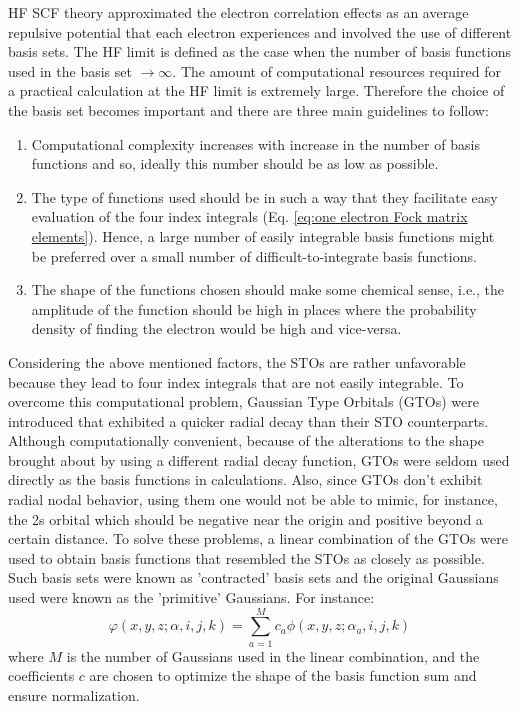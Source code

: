             HF SCF theory approximated the electron correlation effects as an average repulsive potential that each electron experiences and involved the use of different basis sets. The HF limit is defined as the case when the number of basis functions used in the basis set $\to \infty$. The amount of computational resources required for a practical calculation at the HF limit is extremely large. Therefore the choice of the basis set becomes important and there are three main guidelines to follow:
            \begin{enumerate}
               \item Computational complexity increases with increase in the number of basis functions and so, ideally this number should be as low as possible.
               \item The type of functions used should be in such a way that they facilitate easy evaluation of the four index integrals (Eq. \eqref{eq:one electron Fock matrix elements}). Hence, a large number of easily integrable basis functions might be preferred over a small number of difficult-to-integrate basis functions.
               \item The shape of the functions chosen should make some chemical sense, i.e., the amplitude of the function should be high in places where the probability density of finding the electron would be high and vice-versa.
            \end{enumerate}

            Considering the above mentioned factors, the STOs are rather unfavorable because they lead to four index integrals that are not easily integrable. To overcome this computational problem, Gaussian Type Orbitals (GTOs) were introduced that exhibited a quicker radial decay than their STO counterparts. Although computationally convenient, because of the alterations to the shape brought about by using a different radial decay function, GTOs were seldom used directly as the basis functions in calculations. Also, since GTOs don't exhibit radial nodal behavior, using them one would not be able to mimic, for instance, the 2s orbital which should be negative near the origin and positive beyond a certain distance. To solve these problems, a linear combination of the GTOs were used to obtain basis functions that resembled the STOs as closely as possible. Such basis sets were known as 'contracted' basis sets and the original Gaussians used were known as the 'primitive' Gaussians. For instance:
            \begin{equation}\label{eq:contracted}
               \varphi(x, y, z; {\alpha}, i, j, k) = \displaystyle\sum_{a = 1}^M c_a \phi(x, y, z; \alpha_a, i , j, k)
            \end{equation}
            where $M$ is the number of Gaussians used in the linear combination, and the coefficients $c$ are chosen to optimize the shape of the basis function sum and ensure normalization.

